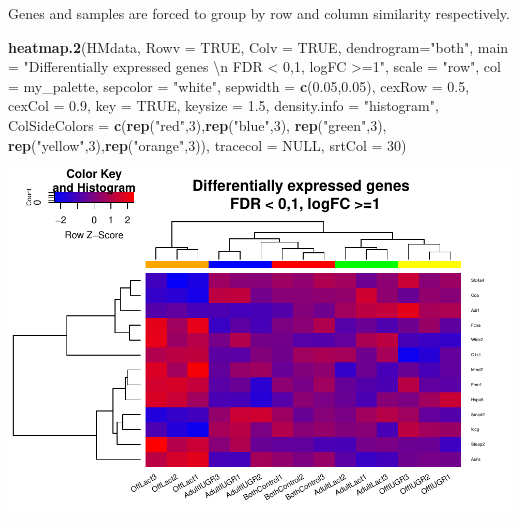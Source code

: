 \documentclass[]{article}
\newenvironment{Shaded}{\begin{snugshade}}{\end{snugshade}}
\newcommand{\KeywordTok}[1]{\textcolor[rgb]{0.13,0.29,0.53}{\textbf{#1}}}
\newcommand{\DataTypeTok}[1]{\textcolor[rgb]{0.13,0.29,0.53}{#1}}
\newcommand{\DecValTok}[1]{\textcolor[rgb]{0.00,0.00,0.81}{#1}}
\newcommand{\FloatTok}[1]{\textcolor[rgb]{0.00,0.00,0.81}{#1}}
\newcommand{\CharTok}[1]{\textcolor[rgb]{0.31,0.60,0.02}{#1}}
\newcommand{\StringTok}[1]{\textcolor[rgb]{0.31,0.60,0.02}{#1}}
\newcommand{\OtherTok}[1]{\textcolor[rgb]{0.56,0.35,0.01}{#1}}
\newcommand{\NormalTok}[1]{#1}
\begin{document}
Genes and samples are forced to group by row and column similarity
respectively.

\begin{Shaded}
\begin{Highlighting}[]
\KeywordTok{heatmap.2}\NormalTok{(HMdata,}
\DataTypeTok{Rowv =} \OtherTok{TRUE}\NormalTok{,}
\DataTypeTok{Colv =} \OtherTok{TRUE}\NormalTok{,}
\DataTypeTok{dendrogram=}\StringTok{"both"}\NormalTok{,}
\DataTypeTok{main =} \StringTok{"Differentially expressed genes }\CharTok{\textbackslash{}n}\StringTok{ FDR < 0,1, logFC >=1"}\NormalTok{,}
\DataTypeTok{scale =} \StringTok{"row"}\NormalTok{,}
\DataTypeTok{col =}\NormalTok{ my_palette,}
\DataTypeTok{sepcolor =} \StringTok{"white"}\NormalTok{,}
\DataTypeTok{sepwidth =} \KeywordTok{c}\NormalTok{(}\FloatTok{0.05}\NormalTok{,}\FloatTok{0.05}\NormalTok{),}
\DataTypeTok{cexRow =} \FloatTok{0.5}\NormalTok{,}
\DataTypeTok{cexCol =} \FloatTok{0.9}\NormalTok{,}
\DataTypeTok{key =} \OtherTok{TRUE}\NormalTok{,}
\DataTypeTok{keysize =} \FloatTok{1.5}\NormalTok{,}
\DataTypeTok{density.info =} \StringTok{"histogram"}\NormalTok{,}
\DataTypeTok{ColSideColors =} \KeywordTok{c}\NormalTok{(}\KeywordTok{rep}\NormalTok{(}\StringTok{"red"}\NormalTok{,}\DecValTok{3}\NormalTok{),}\KeywordTok{rep}\NormalTok{(}\StringTok{"blue"}\NormalTok{,}\DecValTok{3}\NormalTok{), }\KeywordTok{rep}\NormalTok{(}\StringTok{"green"}\NormalTok{,}\DecValTok{3}\NormalTok{), }\KeywordTok{rep}\NormalTok{(}\StringTok{"yellow"}\NormalTok{,}\DecValTok{3}\NormalTok{),}\KeywordTok{rep}\NormalTok{(}\StringTok{"orange"}\NormalTok{,}\DecValTok{3}\NormalTok{)),}
\DataTypeTok{tracecol =} \OtherTok{NULL}\NormalTok{,}
\DataTypeTok{srtCol =} \DecValTok{30}\NormalTok{)}
\end{Highlighting}
\end{Shaded}

\includegraphics{delVal_AnaIsabel_ADO_PEC1_files/figure-latex/unnamed-chunk-56-1.pdf}
\end{document}
